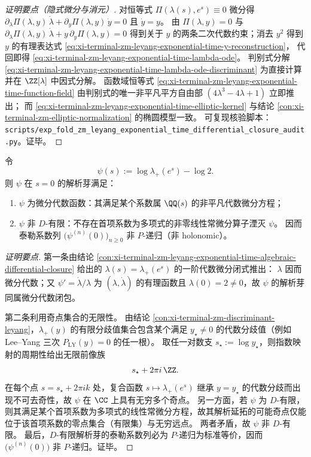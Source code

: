 \begin{proof}[证明要点（隐式微分与消元）]
对恒等式 \(\Pi(\lambda(s),e^s)\equiv0\) 微分得
\(
\partial_\lambda\Pi(\lambda,y)\,\dot\lambda+\partial_y\Pi(\lambda,y)\,\dot y=0
\)
且 \(\dot y=y\)。
由 \(\Pi(\lambda,y)=0\) 与
\(
\partial_\lambda\Pi(\lambda,y)\,\dot\lambda+y\,\partial_y\Pi(\lambda,y)=0
\)
得到关于 \(y\) 的两条二次代数约束；消去 \(y^2\) 得到 \(y\) 的有理表达式 \eqref{eq:xi-terminal-zm-leyang-exponential-time-y-reconstruction}，
代回即得 \eqref{eq:xi-terminal-zm-leyang-exponential-time-lambda-ode}。
判别式分解 \eqref{eq:xi-terminal-zm-leyang-exponential-time-lambda-ode-discriminant} 为直接计算并在 \(\ZZ[\lambda]\) 中因式分解。
函数域恒等式 \eqref{eq:xi-terminal-zm-leyang-exponential-time-function-field} 由判别式的唯一非平凡平方自由部 \((4\lambda^3-4\lambda+1)\) 立即推出；
而 \eqref{eq:xi-terminal-zm-leyang-exponential-time-elliptic-kernel} 与结论 \ref{con:xi-terminal-zm-elliptic-normalization} 的椭圆模型一致。
可复现核验脚本：\texttt{scripts/exp\_fold\_zm\_leyang\_exponential\_time\_differential\_closure\_audit.py}。证毕。
\end{proof}

\begin{conclusion}[\texorpdfstring{$\psi(s)=\log\lambda_+(e^s)-\log2$}{psi(s)} 的微分代数性与非 \texorpdfstring{$D$}{D}-有限性]\label{con:xi-terminal-zm-psi-differential-algebraic-non-dfinite}
令
\[
\psi(s):=\log\lambda_+(e^s)-\log2.
\]
则 \(\psi\) 在 \(s=0\) 的解析芽满足：
\begin{enumerate}
  \item \(\psi\) 为微分代数函数：其满足某个系数属 \(\QQ(s)\) 的非平凡代数微分方程；
  \item \(\psi\) 非 \(D\)-有限：不存在首项系数为多项式的非零线性常微分算子湮灭 \(\psi\)。
  因而泰勒系数列 \(\bigl(\psi^{(n)}(0)\bigr)_{n\ge 0}\) 非 \(P\)-递归（非 holonomic）。
\end{enumerate}
\end{conclusion}
\begin{proof}[证明要点]
第一条由结论 \ref{con:xi-terminal-zm-leyang-exponential-time-algebraic-differential-closure} 给出的 \(\lambda(s)=\lambda_+(e^s)\) 的一阶代数微分闭式推出：
\(\lambda\) 因而微分代数；又 \(\psi'=\dot\lambda/\lambda\) 为 \((\lambda,\dot\lambda)\) 的有理函数且 \(\lambda(0)=2\neq0\)，故 \(\psi\) 的解析芽同属微分代数闭包。
\par
第二条利用奇点集合的无限性。
由结论 \ref{con:xi-terminal-zm-discriminant-leyang}，\(\lambda_+(y)\) 的有限分歧值集合包含某个满足 \(y_\star\neq0\) 的代数分歧值（例如 Lee--Yang 三次 \(P_{\mathrm{LY}}(y)=0\) 的任一根）。
取任一对数支 \(s_\star:=\log y_\star\)，则指数映射的周期性给出无限前像族
\[
s_\star+2\pi i\,\ZZ.
\]
在每个点 \(s=s_\star+2\pi i k\) 处，复合函数 \(s\mapsto \lambda_+(e^s)\) 继承 \(y=y_\star\) 的代数分歧而出现不可去奇性，故 \(\psi\) 在 \(\CC\) 上具有无穷多个奇点。
另一方面，若 \(\psi\) 为 \(D\)-有限，则其满足某个首项系数为多项式的线性常微分方程，故其解析延拓的可能奇点仅能位于该首项系数的零点集合（有限集）与无穷远点。
两者矛盾，故 \(\psi\) 非 \(D\)-有限。
最后，\(D\)-有限解析芽的泰勒系数列必为 \(P\)-递归为标准等价，因而 \(\bigl(\psi^{(n)}(0)\bigr)\) 非 \(P\)-递归。证毕。
\end{proof}

